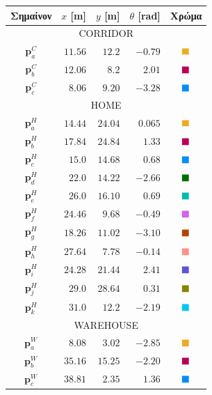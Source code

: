 \begin{table}\centering
  \begin{tabular} {c|rrrc}                                                   \toprule
    Σημαίνον       & $x$ [m]   & $y$  [m]  & $\theta$ [rad]  &  Χρώμα     \\ \toprule
    \multicolumn{5}{c}{CORRIDOR}                                          \\ \midrule
    $\bm{p}_a^C$   & $11.56$   & $12.2$    & $-0.79$         & $\squarea$ \\
    $\bm{p}_b^C$   & $12.06$   & $8.2$     & $2.01$          & $\squareb$ \\
    $\bm{p}_c^C$   & $8.06$    & $9.20$    & $-3.28$         & $\squarec$ \\ \midrule
    \multicolumn{5}{c}{HOME}                                              \\ \midrule
    $\bm{p}_a^H$   & $14.44$   & $24.04$   & $0.065$         & $\squarea$ \\
    $\bm{p}_b^H$   & $17.84$   & $24.84$   & $1.33$          & $\squareb$ \\
    $\bm{p}_c^H$   & $15.0$    & $14.68$   & $0.68$          & $\squarec$ \\
    $\bm{p}_d^H$   & $22.0$    & $14.22$   & $-2.66$         & $\squared$ \\
    $\bm{p}_e^H$   & $26.0$    & $16.10$   & $0.69$          & $\squaree$ \\
    $\bm{p}_f^H$   & $24.46$   & $9.68$    & $-0.49$         & $\squaref$ \\
    $\bm{p}_g^H$   & $18.26$   & $11.02$   & $-3.10$         & $\squareg$ \\
    $\bm{p}_h^H$   & $27.64$   & $7.78$    & $-0.14$         & $\squareh$ \\
    $\bm{p}_i^H$   & $24.28$   & $21.44$   & $2.41$          & $\squarei$ \\
    $\bm{p}_j^H$   & $29.0$    & $28.64$   & $0.31$          & $\squarej$ \\
    $\bm{p}_k^H$   & $31.0$    & $12.2$    & $-2.19$         & $\squarek$ \\ \midrule
    \multicolumn{5}{c}{WAREHOUSE}                                         \\ \midrule
    $\bm{p}_a^W$   & $8.08$    & $3.02$    & $-2.85$         & $\squarea$ \\
    $\bm{p}_b^W$   & $35.16$   & $15.25$   & $-2.20$         & $\squareb$ \\
    $\bm{p}_c^W$   & $38.81$   & $2.35$    & $1.36$          & $\squarec$ \\

\end{tabular}
\end{table}

